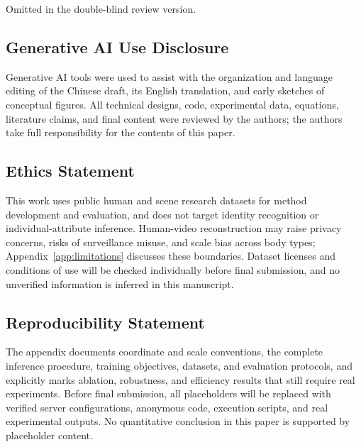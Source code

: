 \documentclass{article}
\begin{document}
Omitted in the double-blind review version.



\subsection*{Generative AI Use Disclosure}
Generative AI tools were used to assist with the organization and language editing of the Chinese draft, its English translation, and early sketches of conceptual figures.
All technical designs, code, experimental data, equations, literature claims, and final content were reviewed by the authors;
the authors take full responsibility for the contents of this paper.

\subsection*{Ethics Statement}
This work uses public human and scene research datasets for method development and evaluation, and does not target identity recognition or individual-attribute inference. Human-video reconstruction may raise privacy concerns, risks of surveillance misuse, and scale bias across body types; Appendix~\ref{app:limitations} discusses these boundaries. Dataset licenses and conditions of use will be checked individually before final submission, and no unverified information is inferred in this manuscript.

\subsection*{Reproducibility Statement}
The appendix documents coordinate and scale conventions, the complete inference procedure, training objectives, datasets, and evaluation protocols, and explicitly marks ablation, robustness, and efficiency results that still require real experiments. Before final submission, all placeholders will be replaced with verified server configurations, anonymous code, execution scripts, and real experimental outputs. No quantitative conclusion in this paper is supported by placeholder content.




\clearpage
\appendix

\end{document}
